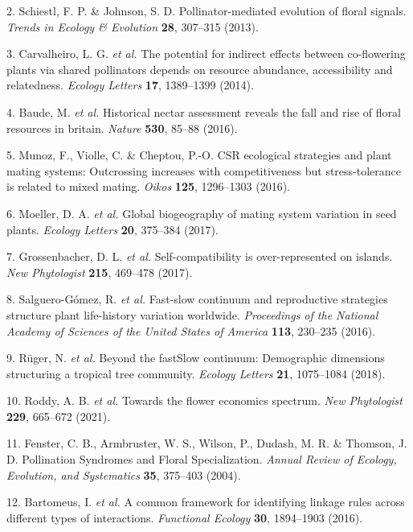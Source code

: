 \documentclass[12pt,a4paper,]{article}
\begin{document}
\hypertarget{ref-schiestl2013}{}
2. Schiestl, F. P. \& Johnson, S. D. Pollinator-mediated evolution of
floral signals. \emph{Trends in Ecology \& Evolution} \textbf{28},
307--315 (2013).

\hypertarget{ref-carvalheiro2014}{}
3. Carvalheiro, L. G. \emph{et al.} The potential for indirect effects
between co-flowering plants via shared pollinators depends on resource
abundance, accessibility and relatedness. \emph{Ecology Letters}
\textbf{17}, 1389--1399 (2014).

\hypertarget{ref-baude2016}{}
4. Baude, M. \emph{et al.} Historical nectar assessment reveals the fall
and rise of floral resources in britain. \emph{Nature} \textbf{530},
85--88 (2016).

\hypertarget{ref-munoz2016}{}
5. Munoz, F., Violle, C. \& Cheptou, P.-O. CSR ecological strategies and
plant mating systems: Outcrossing increases with competitiveness but
stress-tolerance is related to mixed mating. \emph{Oikos} \textbf{125},
1296--1303 (2016).

\hypertarget{ref-moeller2017}{}
6. Moeller, D. A. \emph{et al.} Global biogeography of mating system
variation in seed plants. \emph{Ecology Letters} \textbf{20}, 375--384
(2017).

\hypertarget{ref-grossenbacher2017}{}
7. Grossenbacher, D. L. \emph{et al.} Self-compatibility is
over-represented on islands. \emph{New Phytologist} \textbf{215},
469--478 (2017).

\hypertarget{ref-salguero2016}{}
8. Salguero-Gómez, R. \emph{et al.} Fast-slow continuum and reproductive
strategies structure plant life-history variation worldwide.
\emph{Proceedings of the National Academy of Sciences of the United
States of America} \textbf{113}, 230--235 (2016).

\hypertarget{ref-ruger2018}{}
9. Rüger, N. \emph{et al.} Beyond the fastSlow continuum: Demographic
dimensions structuring a tropical tree community. \emph{Ecology Letters}
\textbf{21}, 1075--1084 (2018).

\hypertarget{ref-roddy2021}{}
10. Roddy, A. B. \emph{et al.} Towards the flower economics spectrum.
\emph{New Phytologist} \textbf{229}, 665--672 (2021).

\hypertarget{ref-fenster2004}{}
11. Fenster, C. B., Armbruster, W. S., Wilson, P., Dudash, M. R. \&
Thomson, J. D. Pollination Syndromes and Floral Specialization.
\emph{Annual Review of Ecology, Evolution, and Systematics} \textbf{35},
375--403 (2004).

\hypertarget{ref-bartomeus2016}{}
12. Bartomeus, I. \emph{et al.} A common framework for identifying
linkage rules across different types of interactions. \emph{Functional
Ecology} \textbf{30}, 1894--1903 (2016).
\end{document}
